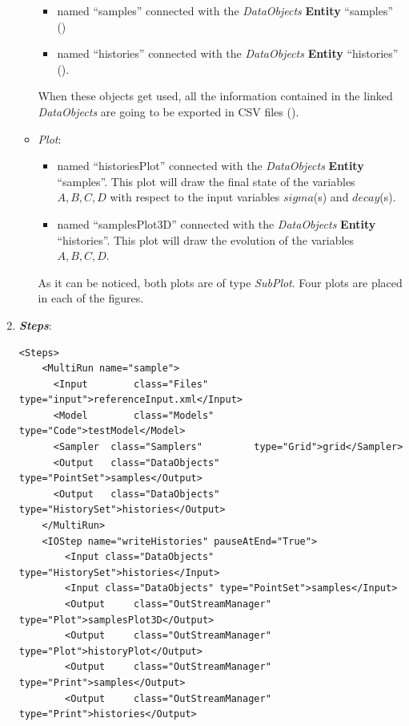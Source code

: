\begin{enumerate}
\begin{itemize}
     \begin{itemize}
       \item named ``samples'' connected with the \textit{DataObjects} \textbf{Entity} ``samples'' 
                ()
       \item named ``histories'' connected with the \textit{DataObjects} \textbf{Entity} ``histories'' ().
     \end{itemize}         
      When these objects get used, all the information contained in the 
      linked  \textit{DataObjects} are going 
    to be exported in CSV files ().
    \item \textit{Plot}: 
    \begin{itemize}
      \item named ``historiesPlot'' connected with the  \textit{DataObjects} 
      \textbf{Entity} ``samples''.  This plot will draw the final state of the
      variables $A,B,C,D$ with respect to the input variables $sigma$(s) 
      and $decay$(s).
      \item named ``samplesPlot3D'' connected with the  
      \textit{DataObjects} \textbf{Entity} ``histories''. This plot will draw the 
      evolution of the variables $A,B,C,D$.
    \end{itemize}
     As it can be noticed, both plots are of type \textit{SubPlot}. Four plots
     are placed in each of the figures.
  \end{itemize}   
   \item \textbf{\textit{Steps}}:   
\begin{lstlisting}[style=XML,morekeywords={arg,extension,pauseAtEnd,overwrite}]
  <Steps>
    <MultiRun name="sample">
      <Input 	    class="Files" 			 type="input">referenceInput.xml</Input>
      <Model 	    class="Models" 		 type="Code">testModel</Model>
      <Sampler 	class="Samplers" 		 type="Grid">grid</Sampler>
      <Output 	class="DataObjects"  type="PointSet">samples</Output>
      <Output 	class="DataObjects"  type="HistorySet">histories</Output>
    </MultiRun>
    <IOStep name="writeHistories" pauseAtEnd="True">
        <Input class="DataObjects" type="HistorySet">histories</Input>
        <Input class="DataObjects" type="PointSet">samples</Input>
        <Output 	class="OutStreamManager" type="Plot">samplesPlot3D</Output>
        <Output 	class="OutStreamManager" type="Plot">historyPlot</Output>
        <Output 	class="OutStreamManager" type="Print">samples</Output>
        <Output 	class="OutStreamManager" type="Print">histories</Output>

\end{lstlisting}
\end{enumerate}
